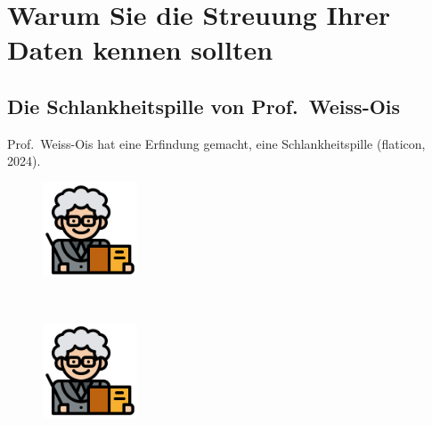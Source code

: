 \documentclass[
  a4paper,
]{scrbook}
\theoremstyle{definition}
\theoremstyle{definition}
\theoremstyle{definition}
\theoremstyle{remark}
\begin{document}
\section{Warum Sie die Streuung Ihrer Daten kennen
sollten}\label{warum-sie-die-streuung-ihrer-daten-kennen-sollten}

\subsection{Die Schlankheitspille von
Prof.~Weiss-Ois}\label{sec-weiss-ois}

Prof.~Weiss-Ois hat eine Erfindung gemacht, eine Schlankheitspille
(flaticon, 2024).

\begin{figure}

\begin{minipage}{0.46\linewidth}

\includegraphics[width=0.25\textwidth,height=\textheight]{img/teacher.png}

\end{minipage}%
%
\begin{minipage}{0.09\linewidth}
~\end{minipage}%
%
\begin{minipage}{0.46\linewidth}

\includegraphics[width=0.25\textwidth,height=\textheight]{img/teacher.png}

\end{minipage}%

\end{figure}%
\end{document}
